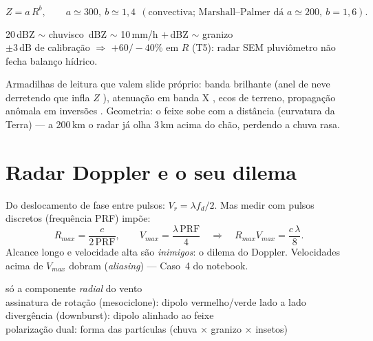 \documentclass[11pt]{article}
\begin{document}
\begin{formalivro}[relação $Z$--$R$]
\[ Z = a\,R^{b},\qquad a \simeq 300,\ b \simeq 1{,}4
\ \ (\text{convectiva; Marshall--Palmer dá } a\simeq200,\ b=1{,}6). \]
\end{formalivro}

\begin{noquadro}
20\,dBZ $\sim$ chuvisco \,dBZ $\sim$ 10\,mm/h $+$\,dBZ $\sim$ granizo\\[2pt]
$\pm3$\,dB de calibração $\Rightarrow$ $+60/{-}40\%$ em $R$ (T5):
radar SEM pluviômetro não fecha balanço hídrico.
\end{noquadro}

Armadilhas de leitura que valem slide próprio: banda brilhante (anel de
neve derretendo que infla $Z$ ), atenuação
em banda X , ecos de terreno, propagação
anômala em inversões . Geometria: o feixe sobe com
a distância (curvatura da Terra) — a 200\,km o radar já olha 3\,km
acima do chão, perdendo a chuva rasa.

\section{Radar Doppler e o seu dilema}\label{sec:doppler}

\begin{formadif}
Do deslocamento de fase entre pulsos: $V_r = \lambda f_d/2$. Mas medir
com pulsos discretos (frequência PRF) impõe:
\[ R_{max} = \frac{c}{2\,\mathrm{PRF}},\qquad
   V_{max} = \frac{\lambda\,\mathrm{PRF}}{4}
\quad\Longrightarrow\quad
\boxed{R_{max}V_{max} = \frac{c\,\lambda}{8}}. \]
Alcance longo e velocidade alta são \emph{inimigos}: o dilema do
Doppler. Velocidades acima de $V_{max}$ dobram (\emph{aliasing}) —
Caso~4 do notebook.
\end{formadif}

\begin{noquadro}
só a componente \emph{radial} do vento\\
assinatura de rotação (mesociclone): dipolo vermelho/verde lado a lado
\hfill {}\\
divergência (downburst): dipolo alinhado ao feixe
\hfill {}\\
polarização dual: forma das partículas (chuva × granizo × insetos)
\end{noquadro}
\end{document}

